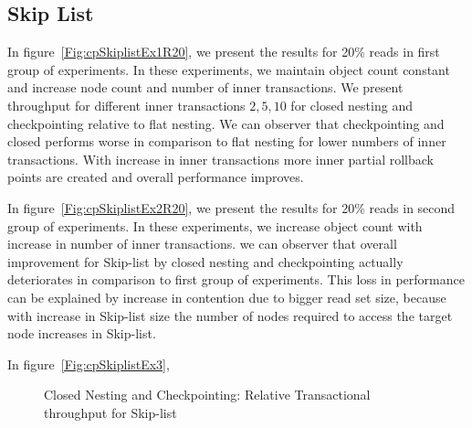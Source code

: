 \documentclass[12pt,english]{report}
\begin{document}
\subsection{Skip List}
In figure~\ref{Fig:cpSkiplistEx1R20}, we present the results for 20\% reads in first group of experiments. In these experiments, we maintain object count constant and increase node count and number of inner transactions. We present throughput for different inner transactions ${2, 5, 10}$ for closed nesting and checkpointing relative to flat nesting. We can observer that checkpointing and closed performs worse in comparison to flat nesting for lower numbers of inner transactions. With increase in inner transactions more inner partial rollback points are created and overall performance improves.

In figure~\ref{Fig:cpSkiplistEx2R20}, we present the results for 20\% reads in second group of experiments. In these experiments, we increase object count with increase in number of inner transactions. we can observer that overall improvement for Skip-list by closed nesting and checkpointing actually deteriorates in comparison to first group of experiments. This loss in performance can be explained by increase in contention due to bigger read set size, because with increase in Skip-list size the number of nodes required to access the target node increases in Skip-list.

In figure~\ref{Fig:cpSkiplistEx3},

\begin{figure}[H]
\centering
{}
\end{figure}
\begin{figure}[H]
\centering
{}
\end{figure}
\begin{figure}[H]
\centering
{}
\caption{Closed Nesting and Checkpointing: Relative Transactional throughput for Skip-list}
\label{Fig:cpSkiplist}
\end{figure}
\end{document}
